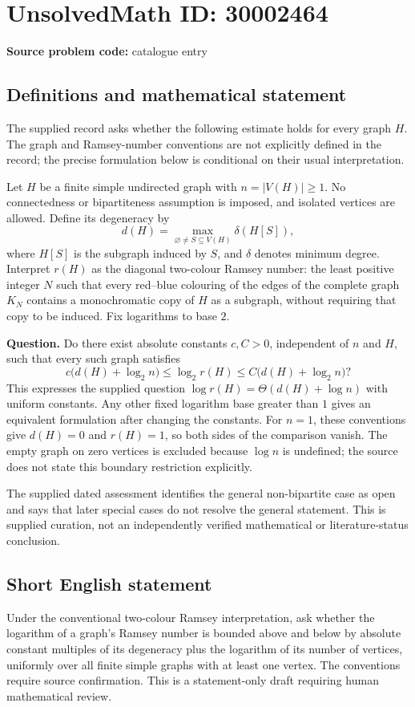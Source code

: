\documentclass[11pt]{article}
\begin{document}
\section*{UnsolvedMath ID: 30002464}
\textbf{Source problem code:} catalogue entry
\subsection{Definitions and mathematical statement}
The supplied record asks whether the following estimate holds for every graph \(H\). The graph and Ramsey-number conventions are not explicitly defined in the record; the precise formulation below is conditional on their usual interpretation.

Let \(H\) be a finite simple undirected graph with \(n=|V(H)|\geq 1\). No connectedness or bipartiteness assumption is imposed, and isolated vertices are allowed. Define its degeneracy by
\[
 d(H)=\max_{\varnothing\ne S\subseteq V(H)}\delta(H[S]),
\]
where \(H[S]\) is the subgraph induced by \(S\), and \(\delta\) denotes minimum degree. Interpret \(r(H)\) as the diagonal two-colour Ramsey number: the least positive integer \(N\) such that every red--blue colouring of the edges of the complete graph \(K_N\) contains a monochromatic copy of \(H\) as a subgraph, without requiring that copy to be induced. Fix logarithms to base \(2\).

\textbf{Question.} Do there exist absolute constants \(c,C>0\), independent of \(n\) and \(H\), such that every such graph satisfies
\[
 c\bigl(d(H)+\log_2 n\bigr)
 \leq \log_2 r(H)
 \leq C\bigl(d(H)+\log_2 n\bigr)?
\]
This expresses the supplied question
\(\log r(H)=\Theta(d(H)+\log n)\)
with uniform constants. Any other fixed logarithm base greater than \(1\) gives an equivalent formulation after changing the constants. For \(n=1\), these conventions give \(d(H)=0\) and \(r(H)=1\), so both sides of the comparison vanish. The empty graph on zero vertices is excluded because \(\log n\) is undefined; the source does not state this boundary restriction explicitly.

The supplied dated assessment identifies the general non-bipartite case as open and says that later special cases do not resolve the general statement. This is supplied curation, not an independently verified mathematical or literature-status conclusion.
\subsection{Short English statement}
Under the conventional two-colour Ramsey interpretation, ask whether the logarithm of a graph's Ramsey number is bounded above and below by absolute constant multiples of its degeneracy plus the logarithm of its number of vertices, uniformly over all finite simple graphs with at least one vertex. The conventions require source confirmation. This is a statement-only draft requiring human mathematical review.
\end{document}
